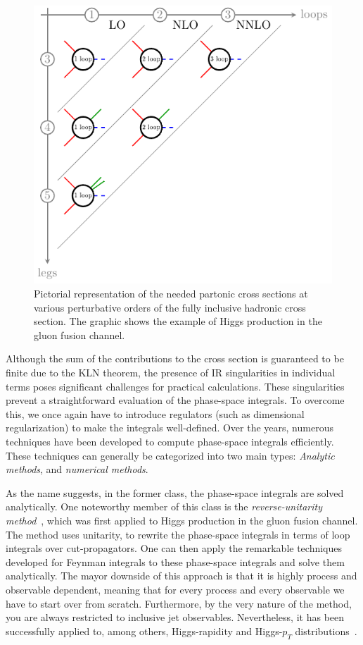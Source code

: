 \begin{figure}[h]
\centering
\includegraphics[width=12cm]{Images/loops_and_legs.pdf}
\caption{Pictorial representation of the needed partonic cross sections at various perturbative orders of the fully inclusive hadronic cross section. The graphic shows the example of Higgs production in the gluon fusion channel.}
\label{fig:2:loops_and_legs}
\end{figure}

Although the sum of the contributions to the cross section is guaranteed to be finite due to the KLN theorem, the presence of IR singularities in individual terms poses significant challenges for practical calculations. These singularities prevent a straightforward evaluation of the phase-space integrals. To overcome this, we once again have to introduce regulators (such as dimensional regularization) to make the integrals well-defined. Over the years, numerous techniques have been developed to compute phase-space integrals efficiently. These techniques can generally be categorized into two main types: \textit{Analytic methods}, and \textit{numerical methods}.

As the name suggests, in the former class, the phase-space integrals are solved analytically. One noteworthy member of this class is the \textit{reverse-unitarity method}~\cite{Anastasiou:2002yz}, which was first applied to Higgs production in the gluon fusion channel. The method uses unitarity, to rewrite the phase-space integrals in terms of loop integrals over cut-propagators. One can then apply the remarkable techniques developed for Feynman integrals to these phase-space integrals and solve them analytically. The mayor downside of this approach is that it is highly process and observable dependent, meaning that for every process and every observable we have to start over from scratch. Furthermore, by the very nature of the method, you are always restricted to inclusive jet observables. Nevertheless, it has been successfully applied to, among others, Higgs-rapidity and Higgs-$p_T$ distributions~\cite{Dulat:2017brz}.

